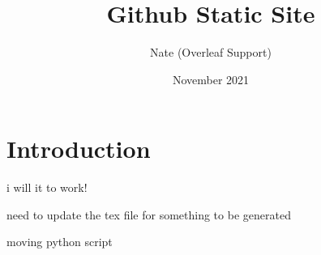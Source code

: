 \documentclass{article}
\title{Github Static Site}
\author{Nate (Overleaf Support)}
\date{November 2021}
\begin{document}
\maketitle

\section{Introduction}

i will it to work!

need to update the tex file for something to be generated

moving python script
\end{document}
